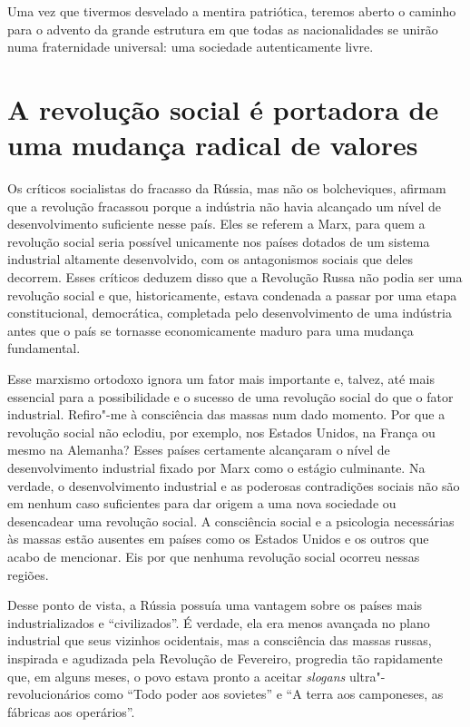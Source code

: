 Uma vez que tivermos desvelado a mentira patriótica, teremos aberto o
caminho para o advento da grande estrutura em que todas as nacionalidades
se unirão numa fraternidade universal: uma sociedade autenticamente
livre.

\chapter{A revolução social é portadora de uma mudança radical de valores}


\sectionitem
Os críticos socialistas do fracasso da Rússia, mas não os bolcheviques,
afirmam que a revolução fracassou porque a indústria não havia
alcançado um nível de desenvolvimento suficiente nesse país. Eles se
referem a Marx, para quem a revolução social seria possível unicamente
nos países dotados de um sistema industrial altamente desenvolvido,
com os antagonismos sociais que deles decorrem. Esses críticos deduzem
disso que a Revolução Russa não podia ser uma revolução social e que,
historicamente, estava condenada a passar por uma etapa
constitucional, democrática, completada pelo desenvolvimento de uma
indústria antes que o país se tornasse economicamente maduro para uma
mudança fundamental.

Esse marxismo ortodoxo ignora um fator mais importante e, talvez, até
mais essencial para a possibilidade e o sucesso de uma revolução
social do que o fator industrial. Refiro"-me à consciência das massas
num dado momento. Por que a revolução social não eclodiu, por exemplo,
nos Estados Unidos, na França ou mesmo na Alemanha? Esses países
certamente alcançaram o nível de desenvolvimento industrial fixado por
Marx como o estágio culminante. Na verdade, o desenvolvimento
industrial e as poderosas contradições sociais não são em nenhum caso
suficientes para dar origem a uma nova sociedade ou desencadear uma
revolução social. A consciência social e a psicologia necessárias às
massas estão ausentes em países como os Estados Unidos e os outros que
acabo de mencionar. Eis por que nenhuma revolução social ocorreu nessas
regiões.

Desse ponto de vista, a Rússia possuía uma vantagem sobre os países
mais industrializados e “civilizados”. É verdade, ela era menos
avançada no plano industrial que seus vizinhos ocidentais, mas a
consciência das massas russas, inspirada e agudizada pela Revolução de
Fevereiro, progredia tão rapidamente que, em alguns meses, o povo
estava pronto a aceitar \textit{slogans} ultra"-revolucionários como “Todo
poder aos sovietes” e “A terra aos camponeses, as fábricas aos
operários”.

